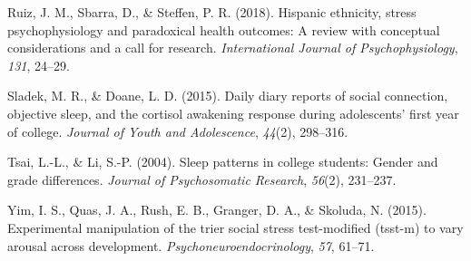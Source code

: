 \documentclass[man, fleqn, noextraspace]{apa6}
\begin{document}
\leavevmode\hypertarget{ref-ruiz2018hispanic}{}%
Ruiz, J. M., Sbarra, D., \& Steffen, P. R. (2018). Hispanic ethnicity, stress psychophysiology and paradoxical health outcomes: A review with conceptual considerations and a call for research. \emph{International Journal of Psychophysiology}, \emph{131}, 24--29.

\leavevmode\hypertarget{ref-sladek2015daily}{}%
Sladek, M. R., \& Doane, L. D. (2015). Daily diary reports of social connection, objective sleep, and the cortisol awakening response during adolescents' first year of college. \emph{Journal of Youth and Adolescence}, \emph{44}(2), 298--316.

\leavevmode\hypertarget{ref-tsai2004sleep}{}%
Tsai, L.-L., \& Li, S.-P. (2004). Sleep patterns in college students: Gender and grade differences. \emph{Journal of Psychosomatic Research}, \emph{56}(2), 231--237.

\leavevmode\hypertarget{ref-yim2015experimental}{}%
Yim, I. S., Quas, J. A., Rush, E. B., Granger, D. A., \& Skoluda, N. (2015). Experimental manipulation of the trier social stress test-modified (tsst-m) to vary arousal across development. \emph{Psychoneuroendocrinology}, \emph{57}, 61--71.

\endgroup
\end{document}
